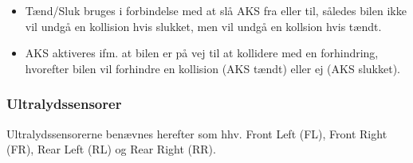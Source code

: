 \begin{itemize}
	\item Tænd/Sluk bruges i forbindelse med at slå AKS fra eller til, således bilen ikke vil undgå en kollision hvis slukket, men vil undgå en kollsion hvis tændt. 
	\item AKS aktiveres ifm. at bilen er på vej til at kollidere med en forhindring, hvorefter bilen vil forhindre en kollision (AKS tændt) eller ej (AKS slukket).
\end{itemize}

\subsubsection{Ultralydssensorer}
Ultralydssensorerne benævnes herefter som hhv. Front Left (FL), Front Right (FR), Rear Left (RL) og Rear Right (RR). 

\clearpage